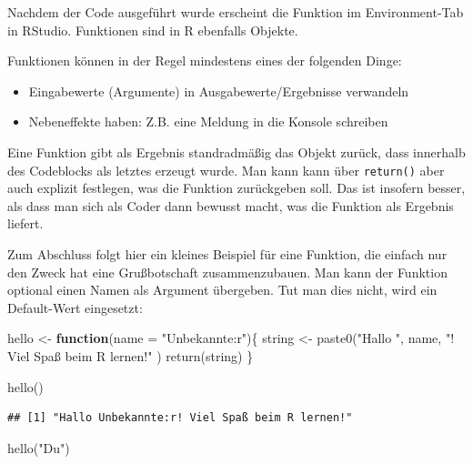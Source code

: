 \documentclass[
]{book}
\newenvironment{Shaded}{\begin{snugshade}}{\end{snugshade}}
\newcommand{\AttributeTok}[1]{\textcolor[rgb]{0.77,0.63,0.00}{#1}}
\newcommand{\ControlFlowTok}[1]{\textcolor[rgb]{0.13,0.29,0.53}{\textbf{#1}}}
\newcommand{\FunctionTok}[1]{\textcolor[rgb]{0.00,0.00,0.00}{#1}}
\newcommand{\NormalTok}[1]{#1}
\newcommand{\OtherTok}[1]{\textcolor[rgb]{0.56,0.35,0.01}{#1}}
\newcommand{\StringTok}[1]{\textcolor[rgb]{0.31,0.60,0.02}{#1}}
\begin{document}
Nachdem der Code ausgeführt wurde erscheint die Funktion im Environment-Tab in RStudio. Funktionen sind in R ebenfalls Objekte.

Funktionen können in der Regel mindestens eines der folgenden Dinge:

\begin{itemize}
\item
  Eingabewerte (Argumente) in Ausgabewerte/Ergebnisse verwandeln
\item
  Nebeneffekte haben: Z.B. eine Meldung in die Konsole schreiben
\end{itemize}

Eine Funktion gibt als Ergebnis standradmäßig das Objekt zurück, dass innerhalb des Codeblocks als letztes erzeugt wurde. Man kann kann über \texttt{return()} aber auch explizit festlegen, was die Funktion zurückgeben soll. Das ist insofern besser, als dass man sich als Coder dann bewusst macht, was die Funktion als Ergebnis liefert.

Zum Abschluss folgt hier ein kleines Beispiel für eine Funktion, die einfach nur den Zweck hat eine Grußbotschaft zusammenzubauen. Man kann der Funktion optional einen Namen als Argument übergeben. Tut man dies nicht, wird ein Default-Wert eingesetzt:

\begin{Shaded}
\begin{Highlighting}[]
\NormalTok{hello }\OtherTok{\textless{}{-}} \ControlFlowTok{function}\NormalTok{(}\AttributeTok{name =} \StringTok{"Unbekannte:r"}\NormalTok{)\{}
\NormalTok{  string }\OtherTok{\textless{}{-}} \FunctionTok{paste0}\NormalTok{(}\StringTok{"Hallo "}\NormalTok{, name, }\StringTok{"! Viel Spaß beim R lernen!"}\NormalTok{ )}
  \FunctionTok{return}\NormalTok{(string)}
\NormalTok{\}}
\end{Highlighting}
\end{Shaded}

\begin{Shaded}
\begin{Highlighting}[]
\FunctionTok{hello}\NormalTok{()}
\end{Highlighting}
\end{Shaded}

\begin{verbatim}
## [1] "Hallo Unbekannte:r! Viel Spaß beim R lernen!"
\end{verbatim}

\begin{Shaded}
\begin{Highlighting}[]
\FunctionTok{hello}\NormalTok{(}\StringTok{"Du"}\NormalTok{)}
\end{Highlighting}
\end{Shaded}
\end{document}
